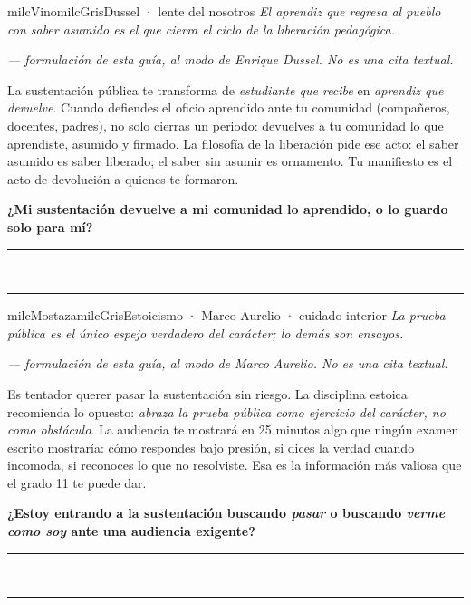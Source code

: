 \documentclass[11pt,letterpaper]{article}
\newcommand{\linead}[1]{\noindent\color{milcLinea}\rule{#1}{0.5pt}\color{milcNegro}}
\begin{document}
\begin{softbox}{milcVino}{milcGris}{Dussel · lente del nosotros}
\textit{El aprendiz que regresa al pueblo con saber asumido es el que cierra el ciclo de la liberación pedagógica.}

{\footnotesize\itshape\color{milcNegro!70}--- formulación de esta guía, al modo de Enrique Dussel. No es una cita textual.}

La sustentación pública te transforma de \emph{estudiante que recibe} en \emph{aprendiz que devuelve}. Cuando defiendes el oficio aprendido ante tu comunidad (compañeros, docentes, padres), no solo cierras un periodo: devuelves a tu comunidad lo que aprendiste, asumido y firmado. La filosofía de la liberación pide ese acto: el saber asumido es saber liberado; el saber sin asumir es ornamento. Tu manifiesto es el acto de devolución a quienes te formaron.

\textbf{¿Mi sustentación devuelve a mi comunidad lo aprendido, o lo guardo solo para mí?}
\end{softbox}
\linead{\linewidth}\\[1mm]
\linead{\linewidth}

\begin{softbox}{milcMostaza}{milcGris}{Estoicismo · Marco Aurelio · cuidado interior}
\textit{La prueba pública es el único espejo verdadero del carácter; lo demás son ensayos.}

{\footnotesize\itshape\color{milcNegro!70}--- formulación de esta guía, al modo de Marco Aurelio. No es una cita textual.}

Es tentador querer pasar la sustentación sin riesgo. La disciplina estoica recomienda lo opuesto: \emph{abraza la prueba pública como ejercicio del carácter, no como obstáculo}. La audiencia te mostrará en 25 minutos algo que ningún examen escrito mostraría: cómo respondes bajo presión, si dices la verdad cuando incomoda, si reconoces lo que no resolviste. Esa es la información más valiosa que el grado 11 te puede dar.

\textbf{¿Estoy entrando a la sustentación buscando \emph{pasar} o buscando \emph{verme como soy} ante una audiencia exigente?}
\end{softbox}
\linead{\linewidth}\\[1mm]
\linead{\linewidth}
\end{document}
